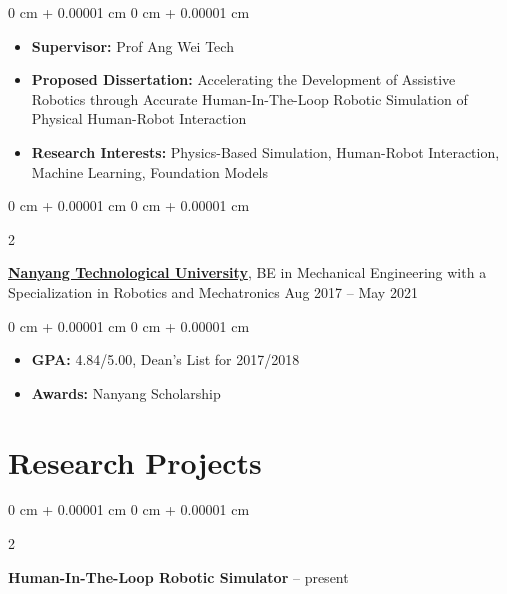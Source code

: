 \documentclass[10pt, letterpaper]{article}
\newenvironment{highlights}{
    \begin{itemize}[
        topsep=0.10 cm,
        parsep=0.10 cm,
        partopsep=0pt,
        itemsep=0pt,
        leftmargin=0 cm + 10pt
    ]
}{
    \end{itemize}
} %
\newenvironment{onecolentry}{
    \begin{adjustwidth}{
        0 cm + 0.00001 cm
    }{
        0 cm + 0.00001 cm
    }
}{
    \end{adjustwidth}
} %
\newenvironment{twocolentry}[2][]{
    \onecolentry
    \def\secondColumn{#2}
    \setcolumnwidth{\fill, 4.5 cm}
    \begin{paracol}{2}
}{
    \switchcolumn \raggedleft \secondColumn
    \end{paracol}
    \endonecolentry
} %
\begin{document}
        \vspace{0.10 cm}
        \begin{onecolentry}
            \begin{highlights}
                \item \textbf{Supervisor:} Prof Ang Wei Tech
                \item \textbf{Proposed Dissertation:} Accelerating the Development of Assistive Robotics through Accurate Human-In-The-Loop Robotic Simulation of Physical Human-Robot Interaction
                \item \textbf{Research Interests:} Physics-Based Simulation, Human-Robot Interaction, Machine Learning, Foundation Models
            \end{highlights}
        \end{onecolentry}


        \vspace{0.2 cm}

        \begin{twocolentry}{
            Aug 2017 – May 2021
        }
            \textbf{\href{https://www.ntu.edu.sg/}{Nanyang Technological University}}, BE in Mechanical Engineering with a Specialization in Robotics and Mechatronics\end{twocolentry}

        \vspace{0.10 cm}
        \begin{onecolentry}
            \begin{highlights}
                \item \textbf{GPA:} 4.84/5.00, Dean's List for 2017/2018
                \item \textbf{Awards:} Nanyang Scholarship
            \end{highlights}
        \end{onecolentry}



    
    \section{Research Projects}



        
        \begin{twocolentry}{
            2021 -- present
        }
            \textbf{Human-In-The-Loop Robotic Simulator}\end{twocolentry}
\end{document}
